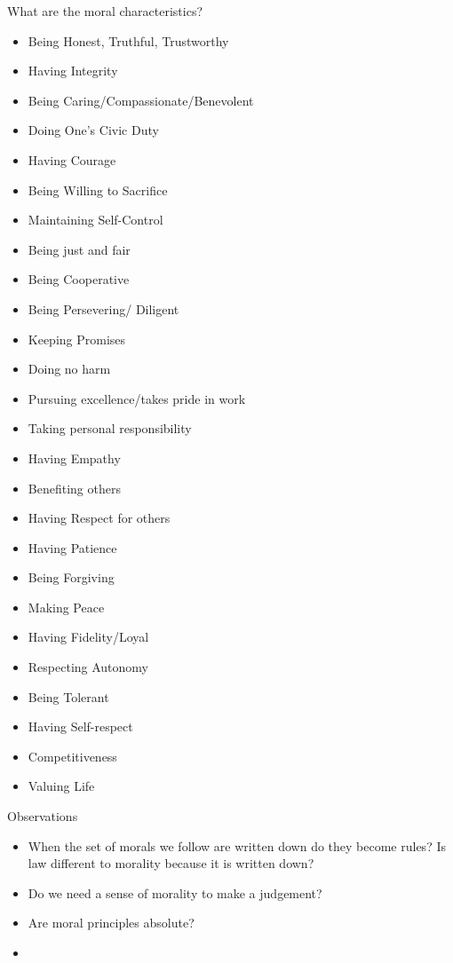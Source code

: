 \documentclass[11pt, oneside]{article}   	%
\begin{document}
\par What are the moral characteristics?
\begin{itemize}
	\item Being Honest, Truthful, Trustworthy
	\item Having Integrity
	\item Being Caring/Compassionate/Benevolent
	\item Doing One's Civic Duty
	\item Having Courage
	\item Being Willing to Sacrifice
	\item Maintaining Self-Control
	\item Being just and fair
	\item Being Cooperative
	\item Being Persevering/ Diligent
	\item Keeping Promises
	\item Doing no harm
	\item Pursuing excellence/takes pride in work
	\item Taking personal responsibility
	\item Having Empathy
	\item Benefiting others 
	\item Having Respect for others
	\item Having Patience
	\item Being Forgiving
	\item Making Peace
	\item Having Fidelity/Loyal
	\item Respecting Autonomy
	\item Being Tolerant
	\item Having Self-respect
	\item Competitiveness
	\item Valuing Life
\end{itemize}

\par Observations
\begin{itemize}
	\item When the set of morals we follow are written down do they become rules? Is law different to morality because it is written down?
	\item Do we need a sense of morality to make a judgement?
	\item Are moral principles absolute?
	\item 
\end{itemize}
\end{document}
